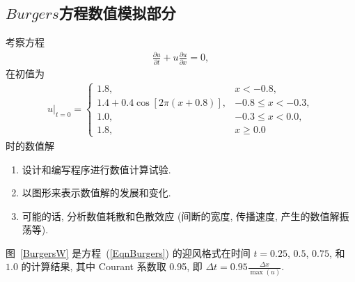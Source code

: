 \documentclass[10.5pt
]{article}
\begin{document}
\subsection{$Burgers$方程数值模拟部分}
考察方程
\begin{align}
\frac{\partial u}{\partial t} + u \frac{\partial u}{\partial x} = 0, \label{EqnBurgers}
\end{align}
在初值为
\begin{align}
u|_{t=0} = \left\{\begin{array}{ll} 1.8, & x < -0.8,
\\
1.4 + 0.4 \cos\left[2 \pi (x + 0.8) \right], & -0.8 \le x < -0.3,
\\
1.0, & -0.3 \le x < 0.0,
\\
1.8, & x \ge 0.0
\end{array} \right.
\end{align}
时的数值解
\begin{enumerate}
\item
  设计和编写程序进行数值计算试验.
\item
  以图形来表示数值解的发展和变化.
\item
  可能的话, 分析数值耗散和色散效应 (间断的宽度, 传播速度, 产生的数值解振荡等).
\end{enumerate}

图~\ref{BurgersW} 是方程~(\ref{EqnBurgers}) 的迎风格式在时间 $t = 0.25$, $0.5$, $0.75$, 和 $1.0$ 的计算结果, 其中 Courant 系数取 0.95,
即 $\Delta t = 0.95 \frac{\Delta x}{\max(u)}$.
\end{document}
